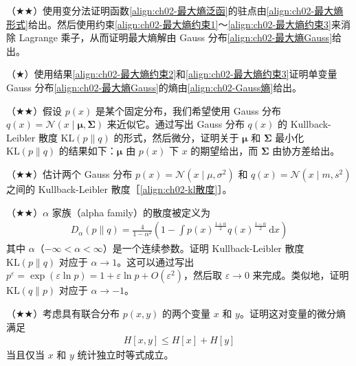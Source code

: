 \documentclass[../../main.tex]{subfiles}
\begin{document}
\begin{exercise}\label{exercise:ch02-24}
（$\bigstar\bigstar$）使用变分法证明函数\eqref{align:ch02-最大熵泛函}的驻点由\eqref{align:ch02-最大熵形式}给出。然后使用约束\eqref{align:ch02-最大熵约束1}～\eqref{align:ch02-最大熵约束3}来消除 Lagrange 乘子，从而证明最大熵解由 Gauss 分布\eqref{align:ch02-最大熵Gauss}给出。
\end{exercise}

\begin{exercise}\label{exercise:ch02-25}
（$\bigstar$）使用结果\eqref{align:ch02-最大熵约束2}和\eqref{align:ch02-最大熵约束3}证明单变量 Gauss 分布\eqref{align:ch02-最大熵Gauss}的熵由\eqref{align:ch02-Gauss熵}给出。
\end{exercise}

\begin{exercise}\label{exercise:ch02-26}
（$\bigstar\bigstar$）假设 $p(x)$ 是某个固定分布，我们希望使用 Gauss 分布 $q(x)=\mathcal{N}(x\mid\boldsymbol{\mu},\boldsymbol{\Sigma})$ 来近似它。通过写出 Gauss 分布 $q(x)$ 的 Kullback-Leibler 散度 $\mathrm{KL}(p\|q)$ 的形式，然后微分，证明关于 $\boldsymbol{\mu}$ 和 $\boldsymbol{\Sigma}$ 最小化 $\mathrm{KL}(p\|q)$ 的结果如下：$\boldsymbol{\mu}$ 由 $p(x)$ 下 $x$ 的期望给出，而 $\boldsymbol{\Sigma}$ 由协方差给出。
\end{exercise}

\begin{exercise}\label{exercise:ch02-27}
（$\bigstar\bigstar$）估计两个 Gauss 分布 $p(x)=\mathcal{N}(x\mid\mu,\sigma^{2})$ 和 $q(x)=\mathcal{N}(x\mid m,s^{2})$ 之间的 Kullback-Leibler 散度［\eqref{align:ch02-kl散度}］。
\end{exercise}

\begin{exercise}\label{exercise:ch02-28}
（$\bigstar\bigstar$）$\alpha$ 家族（alpha family）的散度被定义为
\begin{align}
  D_{\alpha}(p\|q) = \frac{4}{1-\alpha^{2}}\left(1-\int p(x)^{\frac{1+\alpha}{2}}q(x)^{\frac{1-\alpha}{2}}\,\mathrm{d}x\right)
  \label{align:ch02-alpha散度}
\end{align}
其中 $\alpha$（$-\infty<\alpha<\infty$）是一个连续参数。证明 Kullback-Leibler 散度 $\mathrm{KL}(p\|q)$ 对应于 $\alpha\to1$。这可以通过写出 $p^{\varepsilon}=\exp(\varepsilon\ln p)=1+\varepsilon\ln p+O(\varepsilon^{2})$，然后取 $\varepsilon\to0$ 来完成。类似地，证明 $\mathrm{KL}(q\|p)$ 对应于 $\alpha\to-1$。
\end{exercise}

\begin{exercise}\label{exercise:ch02-29}
（$\bigstar\bigstar$）考虑具有联合分布 $p(x,y)$ 的两个变量 $x$ 和 $y$。证明这对变量的微分熵满足
\begin{align}
  H[x,y] \leqslant H[x] + H[y]
  \label{align:ch02-次可加}
\end{align}
当且仅当 $x$ 和 $y$ 统计独立时等式成立。
\end{exercise}
\end{document}
